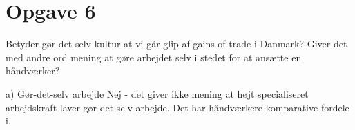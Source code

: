 \section{Opgave 6}

\begin{frame}
Betyder gør-det-selv kultur at vi går glip af gains of trade i Danmark? Giver det med andre ord mening at gøre arbejdet selv i stedet for at ansætte en håndværker?
\end{frame}


\begin{frame}{a) Gør-det-selv arbejde}
Nej - det giver ikke mening at højt specialiseret arbejdskraft laver gør-det-selv arbejde. Det har håndværkere komparative fordele i.
\end{frame}
